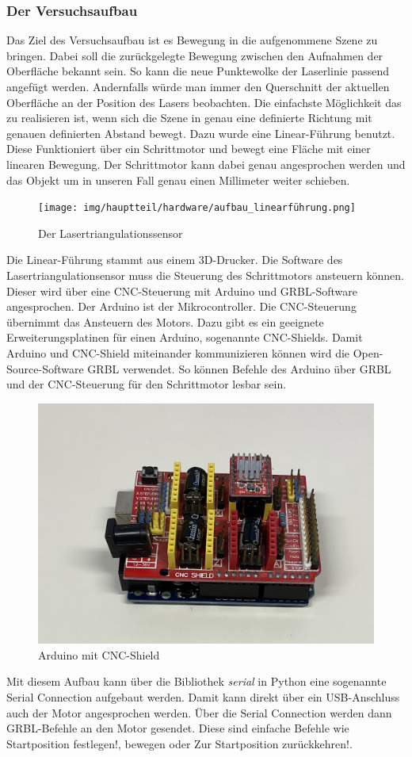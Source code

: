 		\subsubsection{Der Versuchsaufbau}
		Das Ziel des Versuchsaufbau ist es Bewegung in die aufgenommene Szene zu bringen. Dabei soll die zurückgelegte Bewegung zwischen den Aufnahmen der Oberfläche bekannt sein. So kann die neue Punktewolke der Laserlinie passend angefügt werden. Andernfalls würde man immer den Querschnitt der aktuellen Oberfläche an der Position des Lasers beobachten. Die einfachste Möglichkeit das zu realisieren ist, wenn sich die Szene in genau eine definierte Richtung mit genauen definierten Abstand bewegt. Dazu wurde eine Linear-Führung benutzt. Diese Funktioniert über ein Schrittmotor und bewegt eine Fläche mit einer linearen Bewegung. Der Schrittmotor kann dabei genau angesprochen werden und das Objekt um in unseren Fall genau einen Millimeter weiter schieben.
		\begin{figure}[h]
			\centering
			\texttt{[image: img/hauptteil/hardware/aufbau\_linearführung.png]}
			\caption{Der Lasertriangulationssensor}
			\label{fig:aufbau_scanner}
		\end{figure}
		Die Linear-Führung stammt aus einem 3D-Drucker. Die Software des Lasertriangulationsensor muss die Steuerung des Schrittmotors ansteuern können. Dieser wird über eine CNC-Steuerung mit Arduino und GRBL-Software angesprochen. Der Arduino ist der Mikrocontroller. Die CNC-Steuerung übernimmt das Ansteuern des Motors. Dazu gibt es ein geeignete Erweiterungsplatinen für einen Arduino, sogenannte CNC-Shields. Damit Arduino und CNC-Shield miteinander kommunizieren können wird die Open-Source-Software GRBL verwendet. So können Befehle des Arduino über GRBL und der CNC-Steuerung für den Schrittmotor lesbar sein.
		\begin{figure}[h]
			\centering
			\includegraphics[width=0.45\linewidth]{img/hauptteil/hardware/arduino.png}
			\caption{Arduino mit CNC-Shield}
			\label{fig:arduino}
		\end{figure}
		Mit diesem Aufbau kann über die Bibliothek \textit{serial} in Python eine sogenannte \glqq Serial Connection\grqq{} aufgebaut werden. Damit kann direkt über ein USB-Anschluss auch der Motor angesprochen werden. Über die Serial Connection werden dann GRBL-Befehle an den Motor gesendet. Diese sind einfache Befehle wie \glqq Startposition festlegen!\grqq{}, \glqq 1mm bewegen\grqq{} oder \glqq Zur Startposition zurückkehren!\grqq{}.
		
